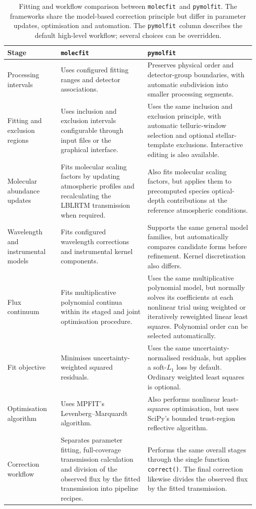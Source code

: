 \documentclass{aa}
\newcommand{\molecfit}{{\texttt{molecfit}}}
\newcommand{\pymolfit}{\texttt{pymolfit}}
\begin{document}
\begin{table}[h]
\centering
\caption{Fitting and workflow comparison between \molecfit\ and \pymolfit. The frameworks share the model-based correction principle but differ in parameter updates, optimisation and automation. The \pymolfit\  column describes the default high-level workflow; several choices can be overridden.}
\label{tab:fitting_implementation}
\small
\renewcommand{\arraystretch}{1.15}
\begin{tabularx}{\textwidth}{@{}p{}XX@{}}
\toprule
Stage & \molecfit\ & \pymolfit\ \\
\midrule
Processing intervals & Uses configured fitting ranges and detector associations. & Preserves physical order and detector-group boundaries, with automatic subdivision into smaller processing segments. \\
Fitting and exclusion regions & Uses inclusion and exclusion intervals configurable through input files or the graphical interface. & Uses the same inclusion and exclusion principle, with automatic telluric-window selection and optional stellar-template exclusions. Interactive editing is also available. \\
Molecular abundance updates & Fits molecular scaling factors by updating atmospheric profiles and recalculating the LBLRTM transmission when required. & Also fits molecular scaling factors, but applies them to precomputed species optical-depth contributions at the reference atmospheric conditions. \\
Wavelength and instrumental models & Fits configured wavelength corrections and instrumental kernel components. & Supports the same general model families, but automatically compares candidate forms before refinement. Kernel discretisation also differs. \\
Flux continuum & Fits multiplicative polynomial continua within its staged and joint optimisation procedure. & Uses the same multiplicative polynomial model, but normally solves its coefficients at each nonlinear trial using weighted or iteratively reweighted linear least squares. Polynomial order can be selected automatically. \\
Fit objective & Minimises uncertainty-weighted squared residuals. & Uses the same uncertainty-normalised residuals, but applies a soft-$L_1$ loss by default. Ordinary weighted least squares is optional. \\
Optimisation algorithm & Uses MPFIT's Levenberg--Marquardt algorithm. & Also performs nonlinear least-squares optimisation, but uses SciPy's bounded trust-region reflective algorithm. \\
Correction workflow & Separates parameter fitting, full-coverage transmission calculation and division of the observed flux by the fitted transmission into pipeline recipes. & Performs the same overall stages through the single function \texttt{correct()}. The final correction likewise divides the observed flux by the fitted transmission. \\
\bottomrule
\end{tabularx}
\end{table}
\end{document}
